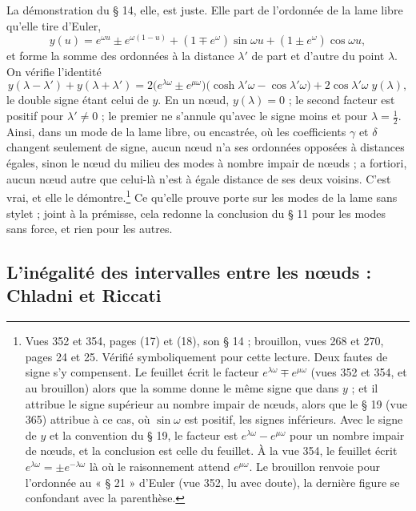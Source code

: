 \documentclass[11pt,a4paper]{article}
\begin{document}
La démonstration du § 14, elle, est juste. Elle part de l'ordonnée de la lame libre qu'elle tire d'Euler,
\[
y(u)=e^{\omega u}\pm e^{\omega(1-u)}+(1\mp e^{\omega})\sin\omega u+(1\pm e^{\omega})\cos\omega u ,
\]
et forme la somme des ordonnées à la distance $\lambda'$ de part et d'autre du point $\lambda$. On vérifie l'identité
\[
y(\lambda-\lambda')+y(\lambda+\lambda')=2\bigl(e^{\lambda\omega}\pm e^{\mu\omega}\bigr)\bigl(\cosh\lambda'\omega-\cos\lambda'\omega\bigr)+2\cos\lambda'\omega\;y(\lambda),
\]
le double signe étant celui de $y$. En un nœud, $y(\lambda)=0$ ; le second facteur est positif pour $\lambda'\neq0$ ; le premier ne s'annule qu'avec le signe moins et pour $\lambda=\frac12$. Ainsi, dans un mode de la lame libre, ou encastrée, où les coefficients $\gamma$ et $\delta$ changent seulement de signe, aucun nœud n'a ses ordonnées opposées à distances égales, sinon le nœud du milieu des modes à nombre impair de nœuds ; a fortiori, aucun nœud autre que celui-là n'est à égale distance de ses deux voisins. C'est vrai, et elle le démontre.\footnote{Vues 352 et 354, pages (17) et (18), son § 14 ; brouillon, vues 268 et 270, pages 24 et 25. Vérifié symboliquement pour cette lecture. Deux fautes de signe s'y compensent. Le feuillet écrit le facteur $e^{\lambda\omega}\mp e^{\mu\omega}$ (vues 352 et 354, et au brouillon) alors que la somme donne le même signe que dans $y$ ; et il attribue le signe supérieur au nombre impair de nœuds, alors que le § 19 (vue 365) attribue à ce cas, où $\sin\omega$ est positif, les signes inférieurs. Avec le signe de $y$ et la convention du § 19, le facteur est $e^{\lambda\omega}-e^{\mu\omega}$ pour un nombre impair de nœuds, et la conclusion est celle du feuillet. À la vue 354, le feuillet écrit $e^{\lambda\omega}=\pm e^{-\lambda\omega}$ là où le raisonnement attend $e^{\mu\omega}$. Le brouillon renvoie pour l'ordonnée au « § 21 » d'Euler (vue 352, lu avec doute), la dernière figure se confondant avec la parenthèse.} Ce qu'elle prouve porte sur les modes de la lame sans stylet ; joint à la prémisse, cela redonne la conclusion du § 11 pour les modes sans force, et rien pour les autres.

\subsection*{L'inégalité des intervalles entre les nœuds : Chladni et Riccati}
\end{document}
